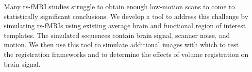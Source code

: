 Many rs-fMRI studies struggle to obtain enough low-motion scans to come to statistically significant conclusions. We develop a tool to address this challenge by simulating rs-fMRIs using existing average brain and functional region of interest templates. The simulated sequences contain brain signal, scanner noise, and motion. We then use this tool to simulate additional images with which to test the registration frameworks and to determine the effects of volume registration on brain signal.





